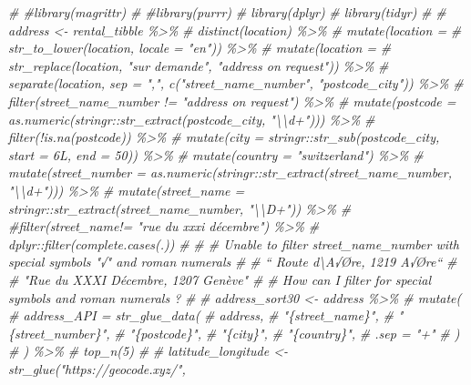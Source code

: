 \documentclass[
]{article}
\newenvironment{Shaded}{\begin{snugshade}}{\end{snugshade}}
\newcommand{\CommentTok}[1]{\textcolor[rgb]{0.56,0.35,0.01}{\textit{#1}}}
\begin{document}
\begin{Shaded}
\begin{Highlighting}[]
\CommentTok{\# \#library(magrittr)}
\CommentTok{\# \#library(purrr)}
\CommentTok{\# library(dplyr)}
\CommentTok{\# library(tidyr)}
\CommentTok{\# }
\CommentTok{\# address \textless{}{-} rental\_tibble \%\textgreater{}\%}
\CommentTok{\#   distinct(location) \%\textgreater{}\%}
\CommentTok{\#   mutate(location =}
\CommentTok{\#            str\_to\_lower(location, locale = "en")) \%\textgreater{}\%}
\CommentTok{\#   mutate(location =}
\CommentTok{\#            str\_replace(location, "sur demande", "address on request")) \%\textgreater{}\%}
\CommentTok{\#   separate(location, sep = ",", c("street\_name\_number", "postcode\_city")) \%\textgreater{}\%}
\CommentTok{\#   filter(street\_name\_number != "address on request") \%\textgreater{}\%}
\CommentTok{\#   mutate(postcode = as.numeric(stringr::str\_extract(postcode\_city, "\textbackslash{}\textbackslash{}d+"))) \%\textgreater{}\%}
\CommentTok{\#   filter(!is.na(postcode)) \%\textgreater{}\%}
\CommentTok{\#   mutate(city = stringr::str\_sub(postcode\_city, start = 6L, end = 50)) \%\textgreater{}\%}
\CommentTok{\#   mutate(country = "switzerland") \%\textgreater{}\%}
\CommentTok{\#   mutate(street\_number = as.numeric(stringr::str\_extract(street\_name\_number, "\textbackslash{}\textbackslash{}d+"))) \%\textgreater{}\%}
\CommentTok{\#   mutate(street\_name = stringr::str\_extract(street\_name\_number, "\textbackslash{}\textbackslash{}D+")) \%\textgreater{}\%}
\CommentTok{\#   \#filter(street\_name!= "rue du xxxi décembre") \%\textgreater{}\%}
\CommentTok{\#   dplyr::filter(complete.cases(.))}
\CommentTok{\# }
\CommentTok{\# \# Unable to filter street\_name\_number with special symbols "√" and roman numerals}
\CommentTok{\# \# “   Route d\textbackslash{}\textquotesingle{}A√Øre, 1219 A√Øre“}
\CommentTok{\# \# "Rue du XXXI Décembre, 1207 Genève"}
\CommentTok{\# \#  How can I filter for special symbols and roman numerals ?}
\CommentTok{\# }
\CommentTok{\# address\_sort30 \textless{}{-} address \%\textgreater{}\%}
\CommentTok{\#   mutate(}
\CommentTok{\#     address\_API = str\_glue\_data(}
\CommentTok{\#       address,}
\CommentTok{\#       "\{street\_name\}",}
\CommentTok{\#       "\{street\_number\}",}
\CommentTok{\#       "\{postcode\}",}
\CommentTok{\#       "\{city\}",}
\CommentTok{\#       "\{country\}",}
\CommentTok{\#       .sep = "+"}
\CommentTok{\#     )}
\CommentTok{\#   ) \%\textgreater{}\%}
\CommentTok{\#   top\_n(5)}
\CommentTok{\# }
\CommentTok{\# latitude\_longitude \textless{}{-} str\_glue("https://geocode.xyz/",}

\end{Highlighting}
\end{Shaded}
\end{document}
